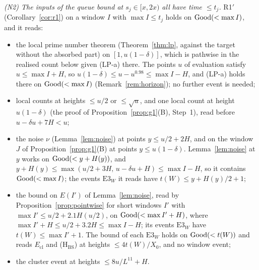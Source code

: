 \emph{(N2) The inputs of the queue bound at $s_j\in[x,2x)$ all have time $\le t_j$.} R1$'$ (Corollary~\ref{cor:r1}) on a window $I$
with $\max I\le t_j$ holds on $\mathrm{Good}(<\max I)$, and it reads:
\begin{itemize}
\item the local prime number theorem (Theorem~\ref{thm:lp}, against the target without the absorbed part) on $[1,u(1-\delta)]$,
which is pathwise in the realised count below given (LP-a) there. The points $u$ of evaluation satisfy $u\le\max I+H$, so
$u(1-\delta)\le u-u^{0.98}\le\max I-H$, and (LP-a) holds there on $\mathrm{Good}(<\max I)$ (Remark~\ref{rem:horizon}); no further
event is needed;
\item local counts at heights $\le u/2$ or $\le\sqrt u$, and one local count at height $u(1-\delta)$
(the proof of Proposition~\ref{prop:g1}(B), Step~1), read before $u-\delta u+7H<u$;
\item the noise $\nu$ (Lemma~\ref{lem:noise}) at points $y\le u/2+2H$, and on the window $J$ of Proposition~\ref{prop:g1}(B) at points
$y\le u(1-\delta)$. Lemma~\ref{lem:noise} at $y$ works on $\mathrm{Good}(<y+H(y))$, and $y+H(y)\le\max(u/2+3H,\,u-\delta u+H)\le\max I-H$, so it
contains $\mathrm{Good}(<\max I)$; the events $\mathrm{E3}_W$ it reads have $t(W)\le y+H(y)/2+1$;
\item the bound on $E(I')$ of Lemma~\ref{lem:noise}, read by Proposition~\ref{prop:pointwise} for short windows $I'$ with
$\max I'\le u/2+2.1H(u/2)$, on $\mathrm{Good}(<\max I'+H)$, where $\max I'+H\le u/2+3.2H\le\max I-H$; its events $\mathrm{E3}_W$ have
$t(W)\le\max I'+1$. The bound of each $\mathrm{E3}_W$ holds on $\mathrm{Good}(<t(W))$ and reads $E_{\mathrm{cl}}$ and \textup{(H$_{\mathrm{BS}}$)} at
heights $\le4t(W)/X_0$, and no window event;
\item the cluster event at heights $\le8u/L^{11}+H$.
\end{itemize}

